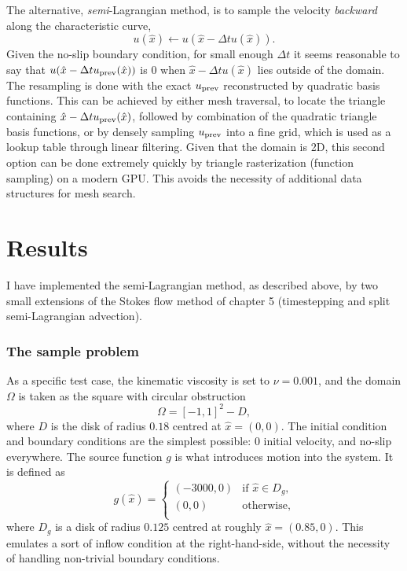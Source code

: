 The alternative, \textit{semi}-Lagrangian method, is to sample the velocity \textit{backward} along the characteristic curve,
    $$u(\hat{x}) \leftarrow u(\hat{x} - \Delta t u(\hat{x})).$$
Given the no-slip boundary condition, for small enough $\Delta t$ it seems reasonable to say that
$u(\hat{x} - \Delta t {u_{\text{prev}}}(\hat{x}))$ is $0$ when $\hat{x} - \Delta t u(\hat{x})$ lies outside of the domain.
The resampling is done with the exact ${u_{\text{prev}}}$ reconstructed by quadratic basis functions. This can be achieved by either mesh traversal, to locate the triangle
containing $\hat{x} - \Delta t {u_{\text{prev}}}(\hat{x})$, followed by combination of the quadratic triangle basis functions, or by densely sampling ${u_{\text{prev}}}$ into
a fine grid, which is used as a lookup table through linear filtering. Given that the domain is 2D, this second option can be done extremely quickly by triangle rasterization (function sampling) on a modern GPU. This avoids the necessity of additional data structures for mesh search.



\section{Results}
I have implemented the semi-Lagrangian method, as described above, by two small extensions
of the Stokes flow method of chapter 5
(timestepping and split semi-Lagrangian advection).
\subsubsection{The sample problem}
As a specific test case, the kinematic viscosity is set to $\nu = 0.001$, and
the domain $\Omega$ is taken as the square with circular obstruction
    $$\Omega = [-1,1]^2 - D,$$
where $D$ is the disk of radius $0.18$ centred at $\hat{x} = (0,0)$.
The initial condition and boundary conditions are the simplest possible: $0$ initial velocity, and no-slip everywhere.
The source function $g$ is what introduces motion into the system. It is defined as
$$
g(\hat{x}) = 
    \left\{\begin{array}{lr}
        (-3000, 0) &\text{if $\hat{x} \in D_g$},\\
        (0, 0) &\text{otherwise},\\
        \end{array}\right.
$$
where $D_g$ is a disk of radius $0.125$ centred at roughly $\hat{x} = (0.85, 0)$.
This emulates a sort of inflow condition at the right-hand-side, without the necessity of handling non-trivial boundary conditions.

